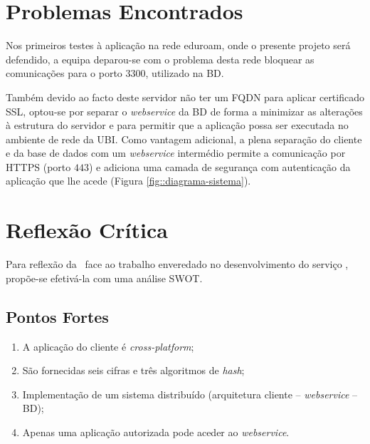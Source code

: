 \section{Problemas Encontrados}
\label{chap4:sec:problemas}


Nos primeiros testes à aplicação na rede \ac{eduroam}, onde o presente projeto será defendido, a equipa deparou-se com o problema desta rede bloquear as comunicações para o porto $3300$, utilizado na \acl{BD}.

Também devido ao facto deste servidor não ter um \ac{FQDN} para aplicar certificado \ac{SSL}, optou-se por separar o \emph{webservice} da \acl{BD} de forma a minimizar as alterações à estrutura do servidor e para permitir que a aplicação possa ser executada no ambiente de rede da \ac{UBI}. Como vantagem adicional, a plena separação do cliente e da base de dados com um \textit{webservice} intermédio permite a comunicação por \ac{HTTPS} (porto $443$) e adiciona uma camada de segurança com autenticação da aplicação que lhe acede (Figura \ref{fig::diagrama-sistema}).


\section{Reflexão Crítica}
\label{chap4:sec:reflexao}

Para reflexão da \groupname~face ao trabalho enveredado no desenvolvimento do serviço \appname, propõe-se efetivá-la com uma análise \ac{SWOT}.


\subsection{Pontos Fortes}
\label{chap4:subsec:pontosfortes}

\begin{enumerate}[nosep]
    \item A aplicação do cliente é \textit{cross-platform};
    \item São fornecidas seis cifras e três algoritmos de \textit{hash};
    \item Implementação de um sistema distribuído (arquitetura cliente -- \textit{webservice} -- \acl{BD});
    \item Apenas uma aplicação autorizada pode aceder ao \textit{webservice}.
\end{enumerate}


